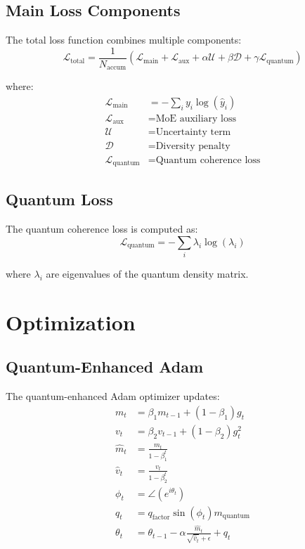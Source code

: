 \documentclass{article}
\begin{document}
\subsection{Main Loss Components}
The total loss function combines multiple components:
\begin{equation}
\mathcal{L}_{\text{total}} = \frac{1}{N_{\text{accum}}}\left(\mathcal{L}_{\text{main}} + \mathcal{L}_{\text{aux}} + \alpha\mathcal{U} + \beta\mathcal{D} + \gamma\mathcal{L}_{\text{quantum}}\right)
\end{equation}

where:
\begin{align*}
\mathcal{L}_{\text{main}} &= -\sum_{i} y_i \log(\hat{y}_i) \\
\mathcal{L}_{\text{aux}} &= \text{MoE auxiliary loss} \\
\mathcal{U} &= \text{Uncertainty term} \\
\mathcal{D} &= \text{Diversity penalty} \\
\mathcal{L}_{\text{quantum}} &= \text{Quantum coherence loss}
\end{align*}

\subsection{Quantum Loss}
The quantum coherence loss is computed as:
\begin{equation}
\mathcal{L}_{\text{quantum}} = -\sum_i \lambda_i \log(\lambda_i)
\end{equation}

where $\lambda_i$ are eigenvalues of the quantum density matrix.

\section{Optimization}

\subsection{Quantum-Enhanced Adam}
The quantum-enhanced Adam optimizer updates:
\begin{align*}
m_t &= \beta_1 m_{t-1} + (1-\beta_1)g_t \\
v_t &= \beta_2 v_{t-1} + (1-\beta_2)g_t^2 \\
\hat{m}_t &= \frac{m_t}{1-\beta_1^t} \\
\hat{v}_t &= \frac{v_t}{1-\beta_2^t} \\
\phi_t &= \angle(e^{i\theta_t}) \\
q_t &= q_{\text{factor}}\sin(\phi_t)m_{\text{quantum}} \\
\theta_t &= \theta_{t-1} - \alpha\frac{\hat{m}_t}{\sqrt{\hat{v}_t} + \epsilon} + q_t
\end{align*}
\end{document}
